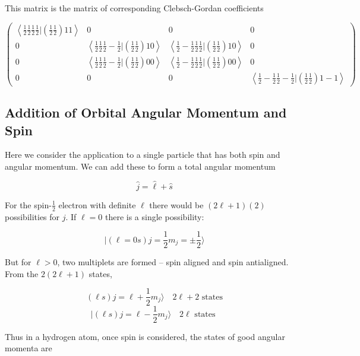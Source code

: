 This matrix is the matrix of corresponding Clebsch-Gordan coefficients

\[
\begin{pmatrix}
  \left\langle \frac{1}{2}\frac{1}{2}\frac{1}{2}\frac{1}{2}| \left(
  \frac{1}{2}\frac{1}{2} \right) 11 \right\rangle & 0 & 0 & 0 \\[3mm]
    0 & \left\langle \frac{1}{2}\frac{1}{2}\frac{1}{2}-\frac{1}{2}| \left(
    \frac{1}{2}\frac{1}{2} \right) 10\right\rangle & \left\langle
    \frac{1}{2}-\frac{1}{2}\frac{1}{2}\frac{1}{2} | \left(
\frac{1}{2}\frac{1}{2} \right) 1 0 \right\rangle & 0 \\[3mm] 
0 & \left\langle \frac{1}{2}\frac{1}{2}\frac{1}{2}-\frac{1}{2} | \left(
\frac{1}{2}\frac{1}{2} \right)  00 \right\rangle & \left\langle \frac{1}{2}-
\frac{1}{2}\frac{1}{2}\frac{1}{2} | \left( \frac{1}{2}\frac{1}{2} \right) 00
\right\rangle & 0 \\[3mm]
0 & 0 & 0 & \left\langle \frac{1}{2}-\frac{1}{2}\frac{1}{2}-\frac{1}{2}
  | \left( \frac{1}{2}\frac{1}{2} \right) 1 -1 \right\rangle  
\end{pmatrix}
\] \vspace{3px}

\subsection{Addition of Orbital Angular Momentum and Spin}

Here we consider the application to a single particle that has both spin and
angular momentum. We can add these to form a total angular momentum 

\[
\hat{j} = \hat{\ell} + \hat{s}
\] \vspace{3px}

For the spin-$\frac{1}{2}$ electron with definite $\ell$ there would be
$(2\ell+1)(2)$ possibilities for $j$. If $\ell = 0$ there is a single
possibility: 

\[
|(\ell = 0s) j = \frac{1}{2} m_j = \pm \frac{1}{2} \rangle
\] \vspace{3px}

But for $\ell > 0$, two multiplets are formed -- spin aligned and spin
antialigned. From the $2(2\ell+1)$ states, 

\[ (\ell s ) j = \ell + \frac{1}{2} m_j \rangle \quad 2\ell+2 \text{ states
} \] 
\[ |(\ell s) j = \ell - \frac{1}{2} m_j \rangle \quad 2\ell \text{ states } \]
\vspace{3px}


Thus in a hydrogen atom, once spin is considered, the states of good angular
momenta are 

